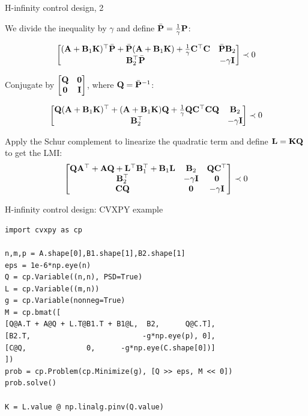 \documentclass{beamer}
\begin{document}
\begin{frame}{H-infinity control design, 2}
	\begin{flushleft}
		
		We divide the inequality by $\gamma$ and define $\bar{\mathbf{P}} = \frac{1}{\gamma} \mathbf{P}$:
		
		\begin{align}
			\begin{bmatrix}
				(\mathbf{A}+\mathbf{B}_1\mathbf{K})^\top\bar{\mathbf{P}}+\bar{\mathbf{P}}(\mathbf{A}+\mathbf{B}_1\mathbf{K})+\frac{1}{\gamma}\mathbf{C}^\top\mathbf{C} & \bar{\mathbf{P}}\mathbf{B}_2 \\
				\mathbf{B}_2^\top\bar{\mathbf{P}}  & -\gamma \mathbf{I}
			\end{bmatrix}
			\prec 0
		\end{align}
		
		Conjugate by $\begin{bmatrix}
			\mathbf{Q} &\mathbf{0} \\
			\mathbf{0}  &  \mathbf{I}
		\end{bmatrix}$, where $\mathbf{Q} = \bar{\mathbf{P}}^{-1}$:
		
		\begin{align}
			\begin{bmatrix}
				\mathbf{Q}(\mathbf{A}+\mathbf{B}_1\mathbf{K})^\top+(\mathbf{A}+\mathbf{B}_1\mathbf{K})\mathbf{Q}+\frac{1}{\gamma}\mathbf{Q}\mathbf{C}^\top\mathbf{C}\mathbf{Q} & \mathbf{B}_2 \\
				\mathbf{B}_2^\top  & -\gamma \mathbf{I}
			\end{bmatrix}
			\prec 0
		\end{align}
		
		Apply the Schur complement to linearize the quadratic term and define $\mathbf{L} = \mathbf{K}\mathbf{Q}$ to get the LMI:
		\begin{align}
			\begin{bmatrix}
				\mathbf{Q}\mathbf{A}^\top + \mathbf{A}\mathbf{Q} + \mathbf{L}^\top \mathbf{B}_1^\top +\mathbf{B}_1 \mathbf{L} & \mathbf{B}_2 & \mathbf{Q}\mathbf{C}^\top \\
				\mathbf{B}_2^\top  & -\gamma \mathbf{I} & \mathbf{0} \\
				\mathbf{C}\mathbf{Q} & \mathbf{0} & -\gamma \mathbf{I}
			\end{bmatrix}
			\prec 0
		\end{align}
		
		
	\end{flushleft}
\end{frame}
	
	
	\begin{frame}[fragile]{H-infinity control design: CVXPY example}
		\begin{flushleft}
			{\small
			\begin{verbatim}
import cvxpy as cp

n,m,p = A.shape[0],B1.shape[1],B2.shape[1]
eps = 1e-6*np.eye(n)
Q = cp.Variable((n,n), PSD=True)
L = cp.Variable((m,n))
g = cp.Variable(nonneg=True)
M = cp.bmat([
[Q@A.T + A@Q + L.T@B1.T + B1@L,  B2,      Q@C.T],
[B2.T,                          -g*np.eye(p), 0],
[C@Q,              0,      -g*np.eye(C.shape[0])]
])
prob = cp.Problem(cp.Minimize(g), [Q >> eps, M << 0])
prob.solve()

K = L.value @ np.linalg.pinv(Q.value)
			\end{verbatim}}
		\end{flushleft}
	\end{frame}
	
\end{document}
